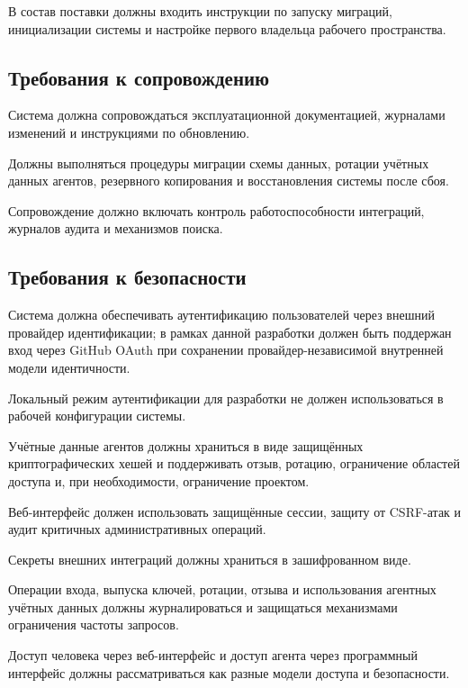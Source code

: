 В состав поставки должны входить инструкции по запуску миграций, инициализации системы и настройке первого владельца рабочего пространства.

\textheadingsep
\subsection{Требования к сопровождению}

\headingtextsep

Система должна сопровождаться эксплуатационной документацией, журналами изменений и инструкциями по обновлению.

Должны выполняться процедуры миграции схемы данных, ротации учётных данных агентов, резервного копирования и восстановления системы после сбоя.

Сопровождение должно включать контроль работоспособности интеграций, журналов аудита и механизмов поиска.

\textheadingsep
\subsection{Требования к безопасности}

\headingtextsep

Система должна обеспечивать аутентификацию пользователей через внешний провайдер идентификации; в рамках данной разработки должен быть поддержан вход через GitHub OAuth при сохранении провайдер-независимой внутренней модели идентичности.

Локальный режим аутентификации для разработки не должен использоваться в рабочей конфигурации системы.

Учётные данные агентов должны храниться в виде защищённых криптографических хешей и поддерживать отзыв, ротацию, ограничение областей доступа и, при необходимости, ограничение проектом.

Веб-интерфейс должен использовать защищённые сессии, защиту от CSRF-атак и аудит критичных административных операций.

Секреты внешних интеграций должны храниться в зашифрованном виде.

Операции входа, выпуска ключей, ротации, отзыва и использования агентных учётных данных должны журналироваться и защищаться механизмами ограничения частоты запросов.

Доступ человека через веб-интерфейс и доступ агента через программный интерфейс должны рассматриваться как разные модели доступа и безопасности.

